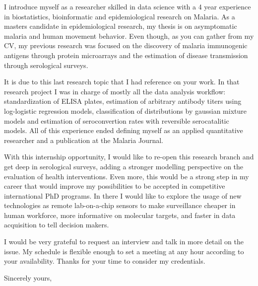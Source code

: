 \documentclass{letter} 					%
\begin{document}
\begin{letter}
\noindent 
I introduce myself as a researcher skilled in data science with a 4 year experience in biostatistics, bioinformatic and epidemiological research on Malaria.
As a masters candidate in epidemiological research, my thesis is on asymptomatic malaria and human movement behavior. Even though, as you can gather from my CV, my previous research was focused on the discovery of malaria immunogenic antigens through protein microarrays and the estimation of disease transmission through serological surveys.

\noindent 
It is due to this last research topic that I had reference on your work. In that research project I was in charge of mostly all the data analysis workflow: standardization of ELISA plates, estimation of arbitrary antibody titers using log-logistic regression models, classification of distributions by gaussian mixture models and estimation of seroconvertion rates with reversible serocatalitic models. All of this experience ended defining myself as an applied quantitative researcher and a publication at the Malaria Journal.

\noindent 
With this internship opportunity, I would like to re-open this research branch and get deep in serological surveys, adding a stronger modelling perspective on the evaluation of health interventions. Even more, this would be a strong step in my career that would improve my possibilities to be accepted in competitive international PhD programs. In there I would like to explore the usage of new technologies as remote lab-on-a-chip sensors to make surveillance cheaper in human workforce, more informative on molecular targets, and faster in data acquisition to tell decision makers.

\noindent
I would be very grateful to request an interview and talk in more detail on the issue. My schedule is flexible enough to set a meeting at any hour according to your availability. Thanks for your time to consider my credentials.

\closing{Sincerely yours,} 





\end{letter}
\end{document}
